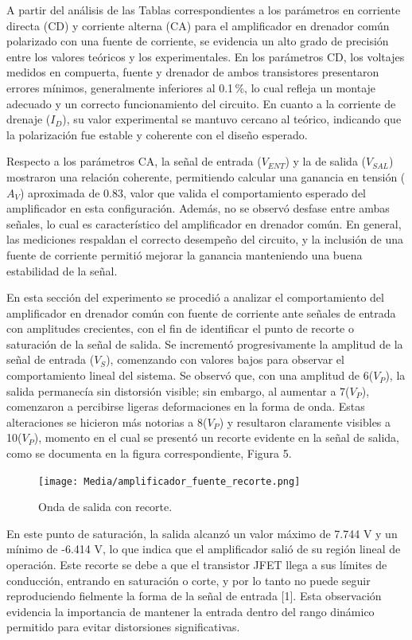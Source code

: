 \documentclass[journal]{IEEEtran}
\begin{document}
\par A partir del análisis de las Tablas correspondientes a los parámetros en corriente directa (CD) y corriente alterna (CA) para el amplificador en drenador común polarizado con una fuente de corriente, se evidencia un alto grado de precisión entre los valores teóricos y los experimentales. En los parámetros CD, los voltajes medidos en compuerta, fuente y drenador de ambos transistores presentaron errores mínimos, generalmente inferiores al 0.1\,\%, lo cual refleja un montaje adecuado y un correcto funcionamiento del circuito. En cuanto a la corriente de drenaje (\( I_D \)), su valor experimental se mantuvo cercano al teórico, indicando que la polarización fue estable y coherente con el diseño esperado.
\par Respecto a los parámetros CA, la señal de entrada (\( V_{ENT} \)) y la de salida (\( V_{SAL} \)) mostraron una relación coherente, permitiendo calcular una ganancia en tensión (\( A_V \)) aproximada de 0.83, valor que valida el comportamiento esperado del amplificador en esta configuración. Además, no se observó desfase entre ambas señales, lo cual es característico del amplificador en drenador común. En general, las mediciones respaldan el correcto desempeño del circuito, y la inclusión de una fuente de corriente permitió mejorar la ganancia manteniendo una buena estabilidad de la señal.
\par En esta sección del experimento se procedió a analizar el comportamiento del amplificador en drenador común con fuente de corriente ante señales de entrada con amplitudes crecientes, con el fin de identificar el punto de recorte o saturación de la señal de salida. Se incrementó progresivamente la amplitud de la señal de entrada (\( V_S \)), comenzando con valores bajos para observar el comportamiento lineal del sistema. Se observó que, con una amplitud de 6(\( V_P \)), la salida permanecía sin distorsión visible; sin embargo, al aumentar a 7(\( V_P \)), comenzaron a percibirse ligeras deformaciones en la forma de onda. Estas alteraciones se hicieron más notorias a 8(\( V_P \)) y resultaron claramente visibles a 10(\( V_P \)), momento en el cual se presentó un recorte evidente en la señal de salida, como se documenta en la figura correspondiente, Figura 5.
\begin{figure}[H]
    \centering
    \texttt{[image: Media/amplificador\_fuente\_recorte.png]}
    \caption{Onda de salida con recorte.}
    \label{fig:amplificador_fuente_recorte.}
\end{figure}
\par En este punto de saturación, la salida alcanzó un valor máximo de 7.744 V y un mínimo de -6.414 V, lo que indica que el amplificador salió de su región lineal de operación. Este recorte se debe a que el transistor JFET llega a sus límites de conducción, entrando en saturación o corte, y por lo tanto no puede seguir reproduciendo fielmente la forma de la señal de entrada [1]. Esta observación evidencia la importancia de mantener la entrada dentro del rango dinámico permitido para evitar distorsiones significativas.
\end{document}
